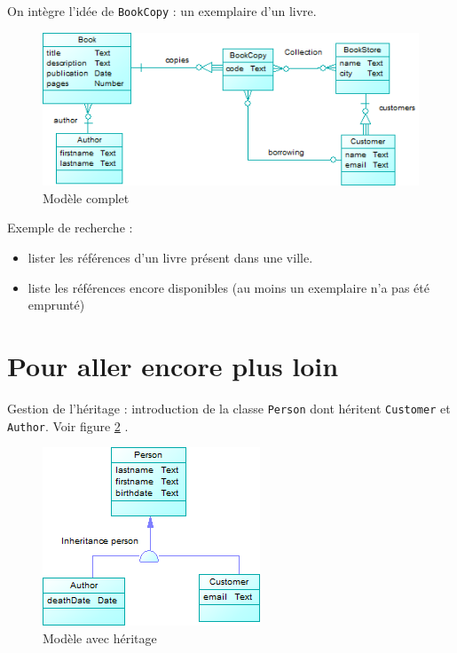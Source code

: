 \documentclass[small,algo]{dushClass}
\begin{document}
On intègre l'idée de \texttt{BookCopy} : un exemplaire d'un livre.\\

\begin{figure}[ht]
	\center
	\includegraphics{images/model_real.png}
	\caption{Modèle complet}\label{model-real}
\end{figure}

Exemple de recherche : 
\begin{itemize}
\item lister les références d'un livre présent dans une ville.
\item liste les références encore disponibles (au moins un exemplaire n'a pas été emprunté)
\end{itemize}

\section{Pour aller encore plus loin}

Gestion de l'héritage : introduction de la classe \texttt{Person} dont héritent \texttt{Customer} et \texttt{Author}. Voir figure \ref{model-inheritance} .\\


\begin{figure}[ht]
	\center
	\includegraphics{images/model_inheritance.png}
	\caption{Modèle avec héritage}\label{model-inheritance}
\end{figure}
\end{document}
